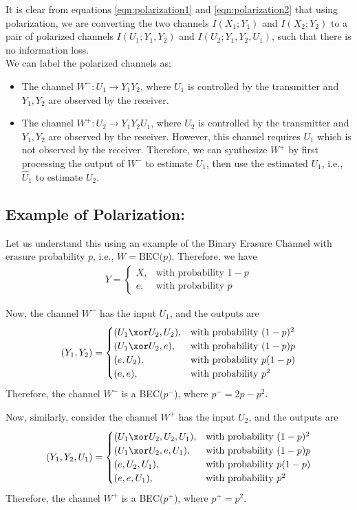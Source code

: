 \documentclass[a4paper,11pt]{article}
\begin{document}
It is clear from equations \ref{eqn:polarization1} and \ref{eqn:polarization2} that using polarization, we are converting the two channels $I(X_1;Y_1)$ and $I(X_2;Y_2)$ to a pair of polarized channels $I(U_1;Y_1,Y_2)$ and $I(U_2;Y_1,Y_2,U_1)$, such that there is no information loss.\\

We can label the polarized channels as:
\begin{itemize}
\item The channel $W^-:U_1 \rightarrow Y_1Y_2$, where $U_1$ is controlled by the transmitter and $Y_1,Y_2$ are observed by the receiver.
\item The channel $W^+:U_2 \rightarrow Y_1Y_2U_1$, where $U_2$ is controlled by the transmitter and $Y_1,Y_2$ are observed by the receiver. However, this channel requires $U_1$ which is not observed by the receiver. Therefore, we can synthesize $W^+$ by first processing the output of $W^-$ to estimate $U_1$, then use the estimated $U_1$, i.e., $\hat U_1$ to estimate $U_2$.
\end{itemize}

\subsection*{Example of Polarization:}
Let us understand this using an example of the Binary Erasure Channel with erasure probability $p$, i.e., $W= \text{BEC($p$)}$. Therefore, we have
\begin{align}
Y = \begin{cases}
X, &\text{with probability $1-p$}\\
e, &\text{with probability $p$}
\end{cases}
\label{eqn:bec}
\end{align}

Now, the channel $W^-$ has the input $U_1$, and the outputs are
\begin{align}
(Y_1,Y_2) = \begin{cases}
(U_1 \xor U_2, U_2), &\text{with probability $(1-p)^2$}\\
(U_1 \xor U_2, e), &\text{with probability $(1-p)p$}\\
(e, U_2), &\text{with probability $p(1-p)$}\\
(e, e), &\text{with probability $p^2$}
\end{cases}
\end{align}
Therefore, the channel $W^-$ is a BEC($p^-$), where $p^- = 2p - p^2$.

Now, similarly, consider the channel $W^+$ has the input $U_2$, and the outputs are
\begin{align}
(Y_1,Y_2,U_1) = \begin{cases}
(U_1 \xor U_2, U_2, U_1), &\text{with probability $(1-p)^2$}\\
(U_1 \xor U_2, e, U_1), &\text{with probability $(1-p)p$}\\
(e, U_2, U_1), &\text{with probability $p(1-p)$}\\
(e, e, U_1), &\text{with probability $p^2$}
\end{cases}
\end{align}
Therefore, the channel $W^+$ is a BEC($p^+$), where $p^+ = p^2$.
\end{document}
